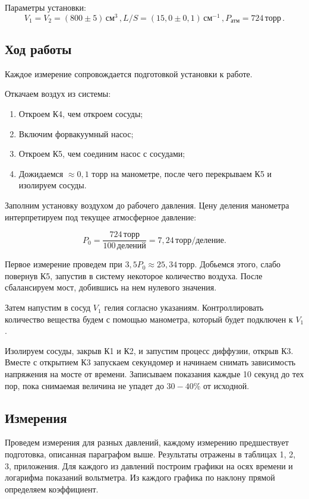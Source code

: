 \documentclass[a4paper, fontsize = 14pt]{article}
\begin{document}
Параметры установки: \[ V_1=V_2=(800\pm5)\,см^3 \, , L/S=(15,0\pm0,1) \, см^{-1} \, , P_{атм}=724 \, торр \, . \]

\subsection*{Ход работы}

Каждое измерение сопровождается подготовкой установки к работе.

Откачаем воздух из системы:

\begin{enumerate}
	\item Откроем К4, чем откроем сосуды;
	\item Включим форвакуумный насос;
	\item Откроем К5, чем соединим насос с сосудами;
	\item Дожидаемся $\approx 0,1 \,\, торр$ на манометре, после чего перекрываем К5 и изолируем сосуды.
\end{enumerate}

Заполним установку воздухом до рабочего давления. Цену деления манометра интерпретируем под текущее атмосферное давление:

\[ P_0 = \frac{ 724 \, торр }{100 \, делений} = 7,24 \, торр / деление.\]

Первое измерение проведем при $3,5 P_0  \approx 25,34 \, торр $. Добьемся этого, слабо повернув К5, запустив в систему некоторое количество воздуха. После сбалансируем мост, добившись на нем нулевого значения.

Затем напустим в сосуд $V_1$ гелия согласно указаниям. Контроллировать количество вещества будем с помощью манометра, который будет подключен к $V_1$. 

Изолируем сосуды, закрыв К1 и К2, и запустим процесс диффузии, открыв К3. Вместе с открытием К3 запускаем секундомер и начинаем снимать зависимость напряжения на мосте от времени. Записываем показания каждые 10 секунд до тех пор, пока снимаемая величина не упадет до $30-40\%$ от исходной. 

\subsection*{Измерения}

Проведем измерения для разных давлений, каждому измерению предшествует подготовка, описанная параграфом выше. Результаты отражены в таблицах 1, 2, 3, приложения. Для каждого из давлений построим графики на осях времени и логарифма показаний вольтметра. Из каждого графика по наклону прямой определяем коэффициент. 
\end{document}
